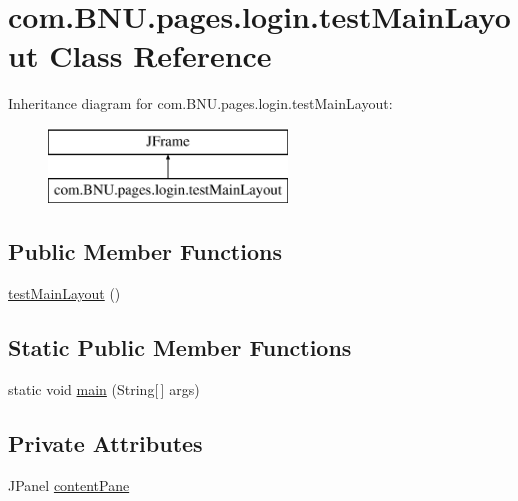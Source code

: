 \hypertarget{classcom_1_1_b_n_u_1_1pages_1_1login_1_1test_main_layout}{}\section{com.\+B\+N\+U.\+pages.\+login.\+test\+Main\+Layout Class Reference}
\label{classcom_1_1_b_n_u_1_1pages_1_1login_1_1test_main_layout}
Inheritance diagram for com.\+B\+N\+U.\+pages.\+login.\+test\+Main\+Layout\+:\begin{figure}[H]
\begin{center}
\leavevmode
\includegraphics[height=2.000000cm]{classcom_1_1_b_n_u_1_1pages_1_1login_1_1test_main_layout}
\end{center}
\end{figure}
\subsection*{Public Member Functions}
\begin{DoxyCompactItemize}
\item 
\mbox{\hyperlink{classcom_1_1_b_n_u_1_1pages_1_1login_1_1test_main_layout_a5a6a1d5e16dbb2153f208816f2eb6a5d}{test\+Main\+Layout}} ()
\end{DoxyCompactItemize}
\subsection*{Static Public Member Functions}
\begin{DoxyCompactItemize}
\item 
static void \mbox{\hyperlink{classcom_1_1_b_n_u_1_1pages_1_1login_1_1test_main_layout_a270dba62c29ec6b3b801a373a966c543}{main}} (String\mbox{[}$\,$\mbox{]} args)
\end{DoxyCompactItemize}
\subsection*{Private Attributes}
\begin{DoxyCompactItemize}
\item 
J\+Panel \mbox{\hyperlink{classcom_1_1_b_n_u_1_1pages_1_1login_1_1test_main_layout_a2283ec6ccc0fa50c00d51fef40fbf316}{content\+Pane}}
\end{DoxyCompactItemize}


